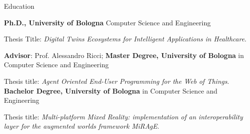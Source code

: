 \setPrefix{\faGraduationCap}
\begin{rubric}{Education}

\entry*[2022 -- 2025]
	\textbf{Ph.D., University of Bologna} Computer Science and Engineering
	\par Thesis Title: \emph{Digital Twins Ecosystems for Intelligent Applications in Healthcare}.
	\vspace{0.5em}
	\par \scriptsize \textbf{Advisor}: Prof. Alessandro Ricci; 
%
\entry*[2019 -- 2022]
	\textbf{Master Degree, University of Bologna} in Computer Science and Engineering
	\par Thesis title: \emph{Agent Oriented End-User Programming for the Web of Things}.
%
\entry*[2016 -- 2019]
    \textbf{Bachelor Degree, University of Bologna} in Computer Science and Engineering
    \par Thesis title: \emph{Multi-platform Mixed Reality: implementation of an interoperability layer for the augmented worlds framework {MiRAgE}}.
\end{rubric}
\resetPrefix{}